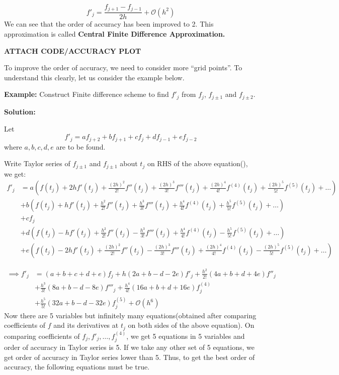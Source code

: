 \documentclass[
]{book}
\begin{document}
\begin{equation}
f'_j = \frac{f_{j+1}-f_{j-1}}{2h} + \mathcal{O}(h^2)
\end{equation}
We can see that the order of accuracy has been improved to 2. This approximation is called \textbf{Central Finite Difference Approximation.}

\textbf{ATTACH CODE/ACCURACY PLOT}

To improve the order of accuracy, we need to consider more ``grid points''. To understand this clearly, let us consider the example below.

\textbf{Example:} Construct Finite difference scheme to find \(f'_j\) from \(f_j\), \(f_{j\pm 1}\) and \(f_{j \pm 2}\).

\textbf{Solution:}

Let
\begin{equation}
f'_j = a f_{j+2}+b f_{j+1}+cf_{j}+d f_{j-1}+e f_{j-2}
\end{equation}
where \(a,b,c,d,e\) are to be found.

Write Taylor series of \(f_{j \pm 1}\) and \(f_{j\pm 1}\) about \(t_j\) on RHS of the above equation(), we get:
\begin{align*}
f'_j  &= a\left(f(t_j)+2hf'(t_j)+\frac{(2h)^2}{2!}f''(t_j)+\frac{(2h)^3}{3!}f'''(t_j)+\frac{(2h)^4}{4!}f^{(4)}(t_j)+\frac{(2h)^5}{5!}f^{(5)}(t_j)+\dots \right) \\
&+ b \left( f(t_j)+hf'(t_j)+\frac{h^2}{2!}f''(t_j)+\frac{h^3}{3!}f'''(t_j)+\frac{h^4}{4!}f^{(4)}(t_j)+\frac{h^5}{5!}f^{(5)}(t_j)+\dots \right)\\
&+ cf_j \\
&+ d \left(f(t_j)-hf'(t_j)+\frac{h^2}{2!}f''(t_j)-\frac{h^3}{3!}f'''(t_j)+\frac{h^4}{4!}f^{(4)}(t_j)-\frac{h^5}{5!}f^{(5)}(t_j)+\dots \right)\\
&+ e \left( f(t_j)-2hf'(t_j)+\frac{(2h)^2}{2!}f''(t_j)-\frac{(2h)^3}{3!}f'''(t_j)+\frac{(2h)^4}{4!}f^{(4)}(t_j)-\frac{(2h)^5}{5!}f^{(5)}(t_j)+\dots \right)
\end{align*}

\begin{align*}
\implies f'_j  &= (a+b+c+d+e) f_j + h(2a+b-d-2e)f'_j+ \frac{h^2}{2!}(4a+b+d+4e) f''_j \\
&+ \frac{h^3}{3!}(8a+b-d-8e) f'''_j + \frac{h^4}{4!}(16a+b+d+16e) f^{(4)}_j\\
&+ \frac{h^5}{5!}(32a+b-d-32e) f^{(5)}_j+\mathcal{O}(h^6)
\end{align*}
Now there are 5 variables but infinitely many equations(obtained after comparing coefficients of \(f\) and its derivatives at \(t_j\) on both sides of the above equation).
On comparing coefficients of \(f_j, f'_j, \dots, f^{(4)}_j\), we get 5 equations in 5 variables and order of accuracy in Taylor series is 5. If we take any other set of 5 equations, we get order of accuracy in Taylor series lower than 5. Thus, to get the best order of accuracy, the following equations must be true.
\end{document}

